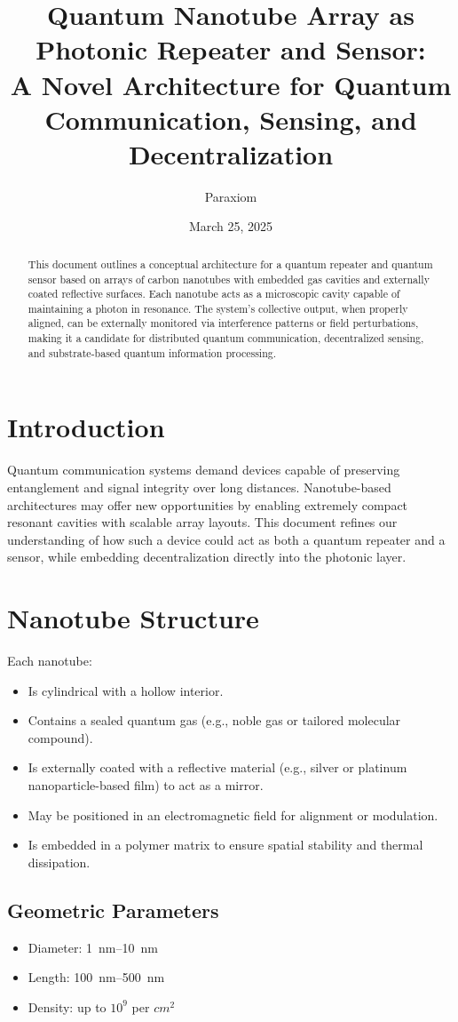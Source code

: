 \documentclass[11pt]{article}
\title{Quantum Nanotube Array as Photonic Repeater and Sensor:\\A Novel Architecture for Quantum Communication, Sensing, and Decentralization}
\author{Paraxiom}
\date{March 25, 2025}
\begin{document}
	
	\maketitle
	
	\begin{abstract}
		This document outlines a conceptual architecture for a quantum repeater and quantum sensor based on arrays of carbon nanotubes with embedded gas cavities and externally coated reflective surfaces. Each nanotube acts as a microscopic cavity capable of maintaining a photon in resonance. The system’s collective output, when properly aligned, can be externally monitored via interference patterns or field perturbations, making it a candidate for distributed quantum communication, decentralized sensing, and substrate-based quantum information processing.
	\end{abstract}
	
	\section{Introduction}
	Quantum communication systems demand devices capable of preserving entanglement and signal integrity over long distances. Nanotube-based architectures may offer new opportunities by enabling extremely compact resonant cavities with scalable array layouts. This document refines our understanding of how such a device could act as both a quantum repeater and a sensor, while embedding decentralization directly into the photonic layer.
	
	\section{Nanotube Structure}
	Each nanotube:
	\begin{itemize}
		\item Is cylindrical with a hollow interior.
		\item Contains a sealed quantum gas (e.g., noble gas or tailored molecular compound).
		\item Is externally coated with a reflective material (e.g., silver or platinum nanoparticle-based film) to act as a mirror.
		\item May be positioned in an electromagnetic field for alignment or modulation.
		\item Is embedded in a polymer matrix to ensure spatial stability and thermal dissipation.
	\end{itemize}
	
	\subsection{Geometric Parameters}
	\begin{itemize}
		\item Diameter: \SIrange{1}{10}{\nano\meter}
		\item Length: \SIrange{100}{500}{\nano\meter}
		\item Density: up to $10^9$ per $\si{cm^2}$
	\end{itemize}
	
\end{document}
